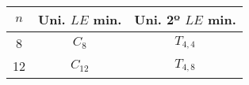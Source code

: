 \begin{tabular}{|c|c|c|}
\hline
$n$ & Uni. $LE$ min. & Uni. 2º $LE$ min. \\
\hline
8 & $C_{8}$ & $T_{4,4}$ \\
\hline
12 & $C_{12}$ & $T_{4,8}$ \\
\hline
\end{tabular}